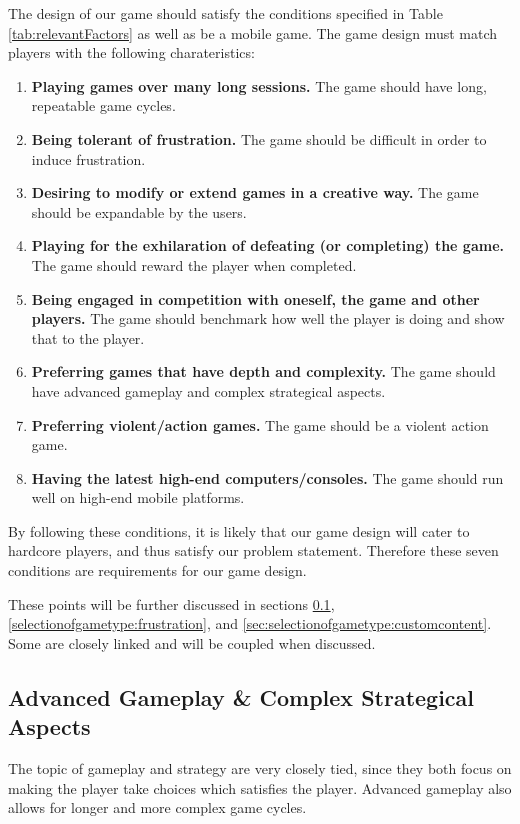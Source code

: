 The design of our game should satisfy the conditions specified in Table \ref{tab:relevantFactors} as well as be a mobile game.
The game design must match players with the following charateristics:
\begin{enumerate}\label{gamedesign:selectionofgametype:importantstuff}
\item \textbf{Playing games over many long sessions.} The game should have long, repeatable game cycles.
\item \textbf{Being tolerant of frustration.} The game should be difficult in order to induce frustration.
\item \textbf{Desiring to modify or extend games in a creative way.} The game should be expandable by the users.
\item \textbf{Playing for the exhilaration of defeating (or completing) the game.} The game should reward the player when completed.
\item \textbf{Being engaged in competition with oneself, the game and other players.} The game should benchmark how well the player is doing and show that to the player.
\item \textbf{Preferring games that have depth and complexity.} The game should have advanced gameplay and complex strategical aspects.
\item \textbf{Preferring violent/action games.} The game should be a violent action game.
\item \textbf{Having the latest high-end computers/consoles.} The game should run well on high-end mobile platforms.
\end{enumerate}
By following these conditions, it is likely that our game design will cater to hardcore players, and thus satisfy our problem statement. 
Therefore these seven conditions are requirements for our game design.

These points will be further discussed in sections \ref{selectionofgametype:advancedgameplay}, \ref{selectionofgametype:frustration}, and \ref{sec:selectionofgametype:customcontent}.
Some are closely linked and will be coupled when discussed.

\subsection{Advanced Gameplay \& Complex Strategical Aspects}\label{selectionofgametype:advancedgameplay}
The topic of gameplay and strategy are very closely tied, since they both focus on making the player take choices which satisfies the player.
Advanced gameplay also allows for longer and more complex game cycles.

